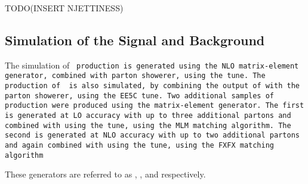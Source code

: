 TODO(INSERT NJETTINESS)


\subsection{Simulation of the Signal and Background}
\label{ssec:simSigBkg}

The simulation of \tt{} production is generated using the \Powheg{} NLO matrix-element generator, combined with \Pythia{} parton showerer, using the \CUET{} tune. The production of \tt{} is also simulated, by combining the output of \Powheg{} with the \Herwigpp{} parton showerer, using the EE5C tune. Two additional samples of \tt{} production were produced using the \mgamc{} matrix-element generator. The first is generated at LO accuracy with up to three additional partons and combined with \Pythia{} using the \CUET{} tune, using the MLM matching algorithm. The second is generated at NLO accuracy with up to two additional partons and again combined with \Pythia{} using the \CUET{} tune, using the FXFX matching algorithm

These generators are referred to as \PowhegPythia{}, \PowhegHerwig{}, \mgamcLO{} and \mgamcNLO{} respectively.


